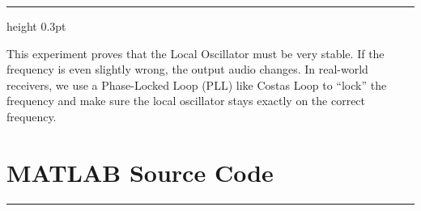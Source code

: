 \documentclass[a4paper]{article}
\begin{document}
\vspace{14pt}
\hrule height 0.3pt
\vspace{14pt}


\vspace{4pt}
\noindent This experiment proves that the Local Oscillator must be very stable. 
If the frequency is even slightly wrong, the output audio changes. In real-world 
receivers, we use a Phase-Locked Loop (PLL) like Costas Loop to ``lock'' the 
frequency and make sure the local oscillator stays exactly on the correct frequency.\\



\section*{\textcolor{DodgerBlue4}{\huge {}  MATLAB Source Code}}
\vspace{0.5cm}
    \noindent\textcolor{DeepSkyBlue4}{\rule{\textwidth}{0.05pt}}
\end{document}
